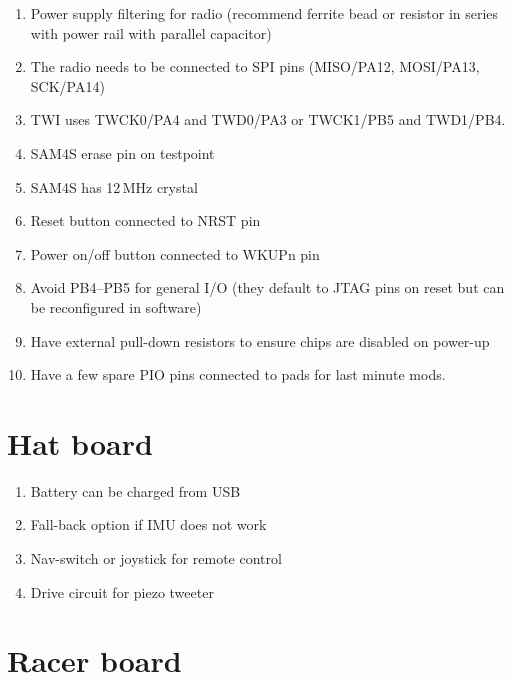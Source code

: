 \documentclass[a4paper, 12pt]{article}
\begin{document}
\begin{enumerate}
\item Power supply filtering for radio (recommend ferrite bead or
  resistor in series with power rail with parallel capacitor)

\item The radio needs to be connected to SPI pins (MISO/PA12,
  MOSI/PA13, SCK/PA14)

\item TWI uses TWCK0/PA4 and TWD0/PA3 or TWCK1/PB5 and TWD1/PB4.
  
\item SAM4S erase pin on testpoint

\item SAM4S has 12\,MHz crystal

\item Reset button connected to NRST pin

\item Power on/off button connected to WKUPn pin

\item Avoid PB4--PB5 for general I/O (they default to JTAG pins on
  reset but can be reconfigured in software)

\item Have external pull-down resistors to ensure chips are disabled on
  power-up

\item Have a few spare PIO pins connected to pads for last minute mods.  
  
\end{enumerate}


\section{Hat board}

\begin{enumerate}
\item Battery can be charged from USB
  
\item Fall-back option if IMU does not work

\item Nav-switch or joystick for remote control  
  
\item Drive circuit for piezo tweeter


\end{enumerate}

\section{Racer board}
\end{document}
